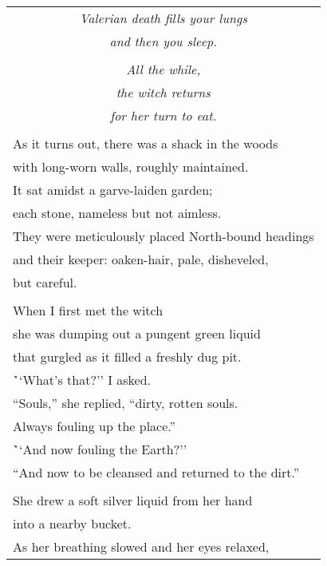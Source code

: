 \documentclass{article}
\begin{document}
\begin{center}
\begin{longtable}{l}
\multicolumn{1}{c}{\textit{Valerian death fills your lungs}} \\
\multicolumn{1}{c}{\textit{and then you sleep.}} \\
\\
\multicolumn{1}{c}{\textit{All the while,}} \\
\multicolumn{1}{c}{\textit{the witch returns}} \\
\multicolumn{1}{c}{\textit{for her turn to eat.}} \\
\\
As it turns out, there was a shack in the woods \\
with long-worn walls, roughly maintained. \\
It sat amidst a garve-laiden garden; \\
each stone, nameless but not aimless. \\
They were meticulously placed North-bound headings \\
and their keeper: oaken-hair, pale, disheveled, \\
but careful. \\
\\
When I first met the witch \\
she was dumping out a pungent green liquid \\
that gurgled as it filled a freshly dug pit. \\
\h ``What's that?'' I asked. \\
``Souls,'' she replied, ``dirty, rotten souls. \\
Always fouling up the place.'' \\
\h ``And now fouling the Earth?'' \\
``And now to be cleansed and returned to the dirt.'' \\
\\
She drew a soft silver liquid from her hand \\
into a nearby bucket. \\
As her breathing slowed and her eyes relaxed, \\

\end{longtable}
\end{center}
\end{document}

